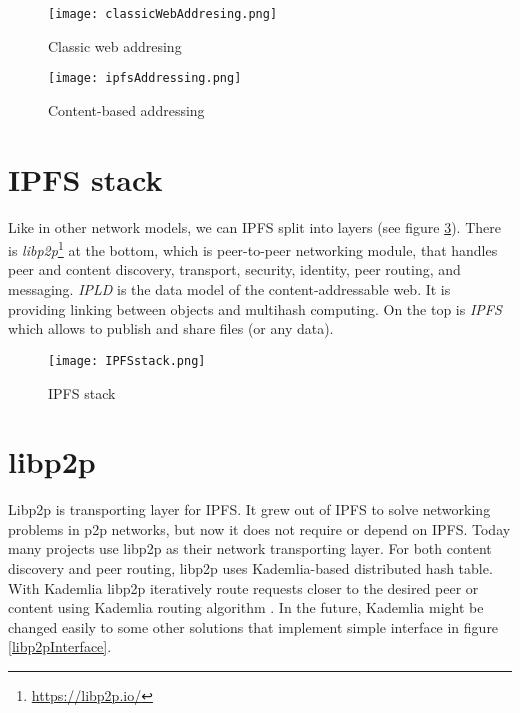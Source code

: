 \begin{figure}[h]
    \centering
    \texttt{[image: classicWebAddresing.png]}
    \caption{Classic web addresing}
    \label{webAddressing}
\end{figure}

\begin{figure}[h]
    \centering
    \texttt{[image: ipfsAddressing.png]}
    \caption{Content-based addressing}
    \label{ipfsAddressing}
\end{figure}

\section{IPFS stack}
Like in other network models, we can IPFS split into layers (see figure \ref{IPFSstack}). There is \textit{libp2p}\footnote{\url{https://libp2p.io/}} at the bottom, which is peer-to-peer networking module, that handles peer and content discovery, transport, security, identity, peer routing, and messaging. \textit{IPLD} is the data model of the content-addressable web. It is providing linking between objects and multihash computing. On the top is \textit{IPFS} which allows to publish and share files (or any data).\cite{IPFSwhitepaper}


\begin{figure}[h]
    \centering
    \texttt{[image: IPFSstack.png]}
    \caption{IPFS stack}
    \label{IPFSstack}
\end{figure}


\section{libp2p}
Libp2p is transporting layer for IPFS. It grew out of IPFS to solve networking problems in p2p networks, but now it does not require or depend on IPFS. Today many projects use libp2p as their network transporting layer. For both content discovery and peer routing, libp2p uses Kademlia-based distributed hash table. With Kademlia libp2p iteratively route requests closer to the desired peer or content using Kademlia routing algorithm \cite{kademlia}. In the future, Kademlia might be changed easily to some other solutions that implement simple interface in figure \ref{libp2pInterface}.



